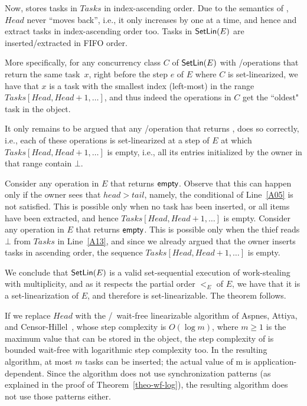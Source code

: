 \begin{thesisproof}
Now, \Put stores tasks in \(Tasks\) in index-ascending order. Due to the semantics of \MaxReg, \(Head\) never ``moves back'', i.e., it only increases by one at a time, and hence \Take and \Steal extract tasks in index-ascending order too. Tasks in \({\sf \small SetLin}(E)\) are inserted/extracted in FIFO order.

More specifically, for any concurrency class \(C\) of \({\sf \small SetLin}(E)\) with \Take/\Steal operations that return the same task~\(x\), right before the step \(e\) of \(E\) where \(C\) is set-linearized, we have that \(x\) is a task with the smallest index (left-most) in the range \(Tasks[Head, Head+1, \hdots]\), and thus indeed the operations in \(C\) get the ``oldest" task in the object.

It only remains to be argued that any \Take/\Steal operation that returns \epty, does so correctly, i.e., each of these operations is set-linearized at a step of \(E\) at which \(Tasks[Head, Head+1, \hdots]\) is empty, i.e., all its entries initialized by the owner in that range contain \(\bot\).

Consider any \Take operation in \(E\) that returns \({\sf \small empty}\).  Observe that this can happen only if the owner sees that \(head > tail\), namely, the conditional of Line~\ref{A05} is not satisfied. This is possible only when no task has been inserted, or all items have been extracted, and hence \(Tasks[Head, Head+1, \hdots]\) is empty. Consider any \Steal operation in \(E\) that returns \({\sf \small empty}\).  This is possible only when the thief reads \(\bot\) from \(Tasks\) in Line~\ref{A13}, and since we already argued that the owner inserts tasks in ascending order, the sequence \(Tasks[Head, Head+1, \hdots]\) is empty.

We conclude that \({\sf \small SetLin}(E)\) is a valid set-sequential execution of work-stealing with multiplicity, and as it respects the partial order \(<_E\) of \(E\), we have that it is a set-linearization of \(E\), and therefore \WFWSM is set-linearizable. The theorem follows.
\end{thesisproof}

If we replace \(Head\) with the \R/\W\ wait-free linearizable \MaxReg algorithm of Aspnes, Attiya, and Censor-Hillel~\cite{DBLP_journals_jacm_AspnesAC12}, whose step complexity is \(O(\log m)\), where \(m \ge 1\) is the maximum value that can be stored in the object, the step complexity of \WFWSM is bounded wait-free with logarithmic step complexity too. In the resulting algorithm, at most $m$ tasks can be inserted; the actual value of m is application-dependent. Since the algorithm does not use \RAW synchronization patterns (as explained in the proof of Theorem~\ref{theo-wf-log}), the resulting algorithm does not use those patterns either.

